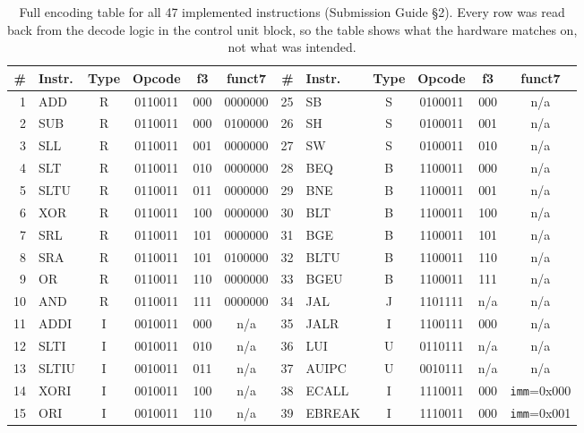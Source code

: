 \documentclass[11pt,a4paper]{article}
\newcommand{\hdr}[1]{\textbf{#1}}
\newcommand{\hrow}{\rowcolor{rvbltint}}
\begin{document}
\begin{table}[htbp]
\centering\scriptsize
\caption{Full encoding table for all 47 implemented instructions
(Submission Guide \S2). Every row was read back from the decode logic in the control
unit block, so the table shows what the hardware matches on, not what was intended.}
\label{tab:encoding}
\setlength{\tabcolsep}{4pt}
\begin{tabular}{rlcccc<{\hspace{0.75em}}>{\hspace{0.75em}}rlcccc}
\toprule
\hrow \# & \hdr{Instr.} & \hdr{Type} & \hdr{Opcode} & \hdr{f3} & \hdr{funct7} &
\# & \hdr{Instr.} & \hdr{Type} & \hdr{Opcode} & \hdr{f3} & \hdr{funct7} \\
\midrule
 1 & ADD    & R & 0110011 & 000 & 0000000 & 25 & SB     & S & 0100011 & 000 & n/a \\
 2 & SUB    & R & 0110011 & 000 & 0100000 & 26 & SH     & S & 0100011 & 001 & n/a \\
 3 & SLL    & R & 0110011 & 001 & 0000000 & 27 & SW     & S & 0100011 & 010 & n/a \\
 4 & SLT    & R & 0110011 & 010 & 0000000 & 28 & BEQ    & B & 1100011 & 000 & n/a \\
 5 & SLTU   & R & 0110011 & 011 & 0000000 & 29 & BNE    & B & 1100011 & 001 & n/a \\
 6 & XOR    & R & 0110011 & 100 & 0000000 & 30 & BLT    & B & 1100011 & 100 & n/a \\
 7 & SRL    & R & 0110011 & 101 & 0000000 & 31 & BGE    & B & 1100011 & 101 & n/a \\
 8 & SRA    & R & 0110011 & 101 & 0100000 & 32 & BLTU   & B & 1100011 & 110 & n/a \\
 9 & OR     & R & 0110011 & 110 & 0000000 & 33 & BGEU   & B & 1100011 & 111 & n/a \\
10 & AND    & R & 0110011 & 111 & 0000000 & 34 & JAL    & J & 1101111 & n/a & n/a \\
11 & ADDI   & I & 0010011 & 000 & n/a     & 35 & JALR   & I & 1100111 & 000 & n/a \\
12 & SLTI   & I & 0010011 & 010 & n/a     & 36 & LUI    & U & 0110111 & n/a & n/a \\
13 & SLTIU  & I & 0010011 & 011 & n/a     & 37 & AUIPC  & U & 0010111 & n/a & n/a \\
14 & XORI   & I & 0010011 & 100 & n/a     & 38 & ECALL  & I & 1110011 & 000 & \texttt{imm}=0x000 \\
15 & ORI    & I & 0010011 & 110 & n/a     & 39 & EBREAK & I & 1110011 & 000 & \texttt{imm}=0x001 \\

\end{tabular}
\end{table}
\end{document}
